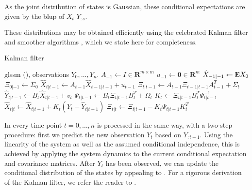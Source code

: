 As the joint distribution of states is Gaussian, these conditional expectations are given by the \acrfull{blup} of $X_{t}$ $Y_{:s}$. 


These distributions may be obtained efficiently using the celebrated Kalman filter and smoother algorithms , which we state here for completeness.

\begin{algorithm}
    \caption{Kalman filter}
    \label{alg:kalman_filter}
    \begin{algorithmic}
        \Require \gls{glssm} (), observations $Y_{0}, \dots, Y_{n}$.
        \Statex
        \State $A_{-1} \gets I \in \mathbf R^{m\times m}$ 
        \State $u_{-1} \gets \mathbf 0 \in \mathbf R^{m}$ 
        \State $\hat X_{-1|-1} \gets \mathbf E X_0$
        \State $\Xi_{0|-1} \gets \Sigma_{0}$
        \Statex
            \Statex
            \State $\hat X_{t| t - 1} \gets A_{t-1} \hat X_{t-1|t-1} + u_{t-1}$ 
            \State $\Xi_{t | t - 1} \gets A_{t - 1} \Xi_{t - 1 | t - 1 } A_{t - 1}^{T} + \Sigma_{t}$ 
            \State $\hat Y_{t|t - 1} \gets B_{t}\hat X_{t | t - 1} + v_{t}$
            \State $\Psi_{t|t - 1} \gets B_{t}\Xi_{t | t - 1} B_{t}^T + \Omega_{t}$
            \Statex
            \State $K_t \gets \Xi_{t | t - 1} B_{t}^T \Psi_{t | t - 1} ^{-1}$ 
            \State $\hat X_{t | t} \gets \hat X_{t | t - 1} + K_t (Y_{t} - \hat Y_{t | t - 1})$
            \State $\Xi_{t| t } \gets \Xi_{t | t - 1} - K_t \Psi_{t| t - 1} K_t^T$
        \EndFor
    \end{algorithmic}
\end{algorithm}
In  every time point $t = 0, \dots, n$ is processed in the same way, with a two-step procedure: first we predict the new observation $Y_{t}$ based on $Y_{:t-1}$. Using the linearity of the system as well as the assumed conditional independence, this is achieved by applying the system dynamics to the current conditional expectation and covariance matrices. After $Y_{t}$ has been observed, we can update the conditional distribution of the states by appealing to .
For a rigorous derivation of the Kalman filter, we refer the reader to \cite[Chapter 4]{Durbin2012Time}. 

